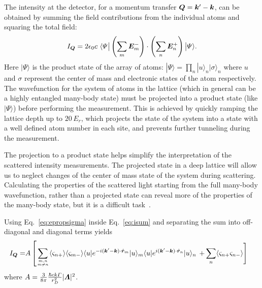 The intensity at the detector, for a momentum transfer $\bm{Q}=\bm{k}'-\bm{k}$,
can be obtained by summing the field contributions from the individual atoms
and squaring the total field:
\begin{equation}
 I_{\bm{Q}}  =
  2 \epsilon_{0} c \
    \langle \Psi \big|  \left(  \sum_{m}  \bm{E}_{m}^{-} \right) \cdot
           \left(  \sum_{n} \bm{E}_{n}^{+} \right) \big|  \Psi\rangle.
  \label{eq:isum}
\end{equation}
Here $|\Psi\rangle$ is the product state of the array of atoms:  $|\Psi\rangle
= \prod_{n} |u \rangle_{n} |\sigma \rangle_{n}$ where $u$ and $\sigma$
represent the center of mass and electronic states of the atom respectively.
The wavefunction for the system of atoms in the lattice (which in general can
be a highly entangled many-body state) must be projected into a product state
(like $|\Psi\rangle$)  before performing the measurement.  This is achieved by
quickly ramping the lattice depth up to $20\,E_{r}$,  which projects the state
of the system into a state with a well defined atom number in each site, and
prevents further tunneling during the measurement.  

The projection to a product state helps simplify the interpretation of the
scattered intensity measurements.  The projected state in a deep lattice will
allow us to neglect changes of the center of mass state of the system during
scattering.  Calculating the properties of the scattered light starting from
the full many-body wavefunction, rather than a projected state can reveal more
of the properties of the many-body state, but it is a difficult
task~\cite{PhysRevX.4.031036}.

Using Eq.~\ref{eq:epropsigma} inside Eq.~\ref{eq:isum} and separating the sum
into off-diagonal and diagonal terms yields
\begin{equation}
\begin{split}
 I_{\bv{Q}} = &
  A\left[
    \sumOff \langle \varsigma_{n+}\rangle \langle \varsigma_{m-} \rangle
\langle u | e^{-i(\bv{k}'-\bv{k} ) \cdot \hat{\bv{r}}_{m} } | u \rangle_{m} 
 \langle u | 
e^{i(\bv{k}'-\bv{k} ) \cdot \hat{\bv{r}}_{n} }| u \rangle_{n}  \right.
  \left.  + \sum_{n}  \langle \varsigma_{n+} \varsigma_{n-} \rangle
\right]
\end{split}
\label{eq:IQsum}
\end{equation}
where $A = \frac{3}{8\pi} \frac{\hbar c k
\Gamma}{r_{D}^{2}}|\bm{\Lambda}|^{2}$.   


